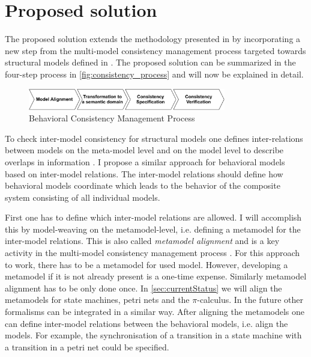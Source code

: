 \documentclass[conference]{IEEEtran}
\begin{document}
\section{Proposed solution}
The proposed solution extends the methodology presented in \cite{engelsMethodologySpecifyingAnalyzing2001} by incorporating a new step from the multi-model consistency management process targeted towards structural models defined in \cite{stunkelMultipleModelSynchronization2020}.
The proposed solution can be summarized in the four-step process in \autoref{fig:consistency_process} and will now  be explained in detail.

\begin{figure}[h]
    \centering
    \includegraphics[width=3.4in]{methodology}
    \caption{Behavioral Consistency Management Process}
    \label{fig:consistency_process}
\end{figure}

To check inter-model consistency for structural models one defines inter-relations between models on the meta-model level and on the model level to describe overlaps in information \cite{stunkelMultipleModelSynchronization2020}.
I propose a similar approach for behavioral models based on inter-model relations.
The inter-model relations should define how behavioral models coordinate which leads to the behavior of the composite system consisting of all individual models.

First one has to define which inter-model relations are allowed.
I will accomplish this by model-weaving on the metamodel-level, i.e. defining a metamodel for the inter-model relations.
This is also called \textit{metamodel alignment} and is a key activity in the multi-model consistency management process \cite{stunkelMultipleModelSynchronization2020}.
For this approach to work, there has to be a metamodel for used model.
However, developing a metamodel if it is not already present is a one-time expense.
Similarly metamodel alignment has to be only done once.
In \autoref{sec:currentStatus} we will align the metamodels for state machines, petri nets and the $\pi$-calculus.
In the future other formalisms can be integrated in a similar way.
After aligning the metamodels one can define inter-model relations between the behavioral models, i.e. align the models.
For example, the synchronisation of a transition in a state machine with a transition in a petri net could be specified.
\end{document}

